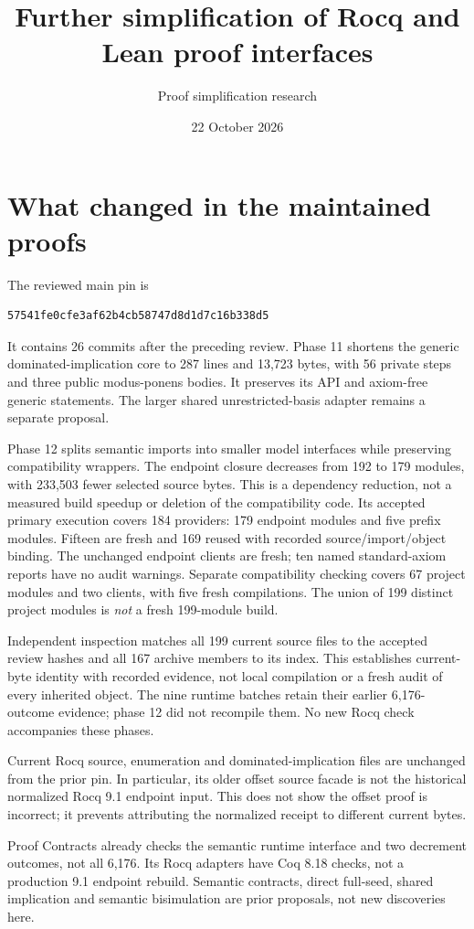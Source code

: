 \documentclass[11pt]{article}
\title{Further simplification of Rocq and Lean proof interfaces}
\author{Proof simplification research}\date{22 October 2026}
\begin{document}
\maketitle
\section{What changed in the maintained proofs}
The reviewed main pin is
\begin{verbatim}
57541fe0cfe3af62b4cb58747d8d1d7c16b338d5
\end{verbatim}
It contains 26 commits after the preceding review. Phase 11 shortens the generic dominated-implication core to 287 lines and 13,723 bytes, with 56 private steps and three public modus-ponens bodies. It preserves its API and axiom-free generic statements. The larger shared unrestricted-basis adapter remains a separate proposal.

Phase 12 splits semantic imports into smaller model interfaces while preserving compatibility wrappers. The endpoint closure decreases from 192 to 179 modules, with 233,503 fewer selected source bytes. This is a dependency reduction, not a measured build speedup or deletion of the compatibility code. Its accepted primary execution covers 184 providers: 179 endpoint modules and five prefix modules. Fifteen are fresh and 169 reused with recorded source/import/object binding. The unchanged endpoint clients are fresh; ten named standard-axiom reports have no audit warnings. Separate compatibility checking covers 67 project modules and two clients, with five fresh compilations. The union of 199 distinct project modules is \emph{not} a fresh 199-module build.

Independent inspection matches all 199 current source files to the accepted review hashes and all 167 archive members to its index. This establishes current-byte identity with recorded evidence, not local compilation or a fresh audit of every inherited object. The nine runtime batches retain their earlier 6,176-outcome evidence; phase 12 did not recompile them. No new Rocq check accompanies these phases.

Current Rocq source, enumeration and dominated-implication files are unchanged from the prior pin. In particular, its older offset source facade is not the historical normalized Rocq 9.1 endpoint input. This does not show the offset proof is incorrect; it prevents attributing the normalized receipt to different current bytes.

Proof Contracts already checks the semantic runtime interface and two decrement outcomes, not all 6,176. Its Rocq adapters have Coq 8.18 checks, not a production 9.1 endpoint rebuild. Semantic contracts, direct full-seed, shared implication and semantic bisimulation are prior proposals, not new discoveries here.
\end{document}
